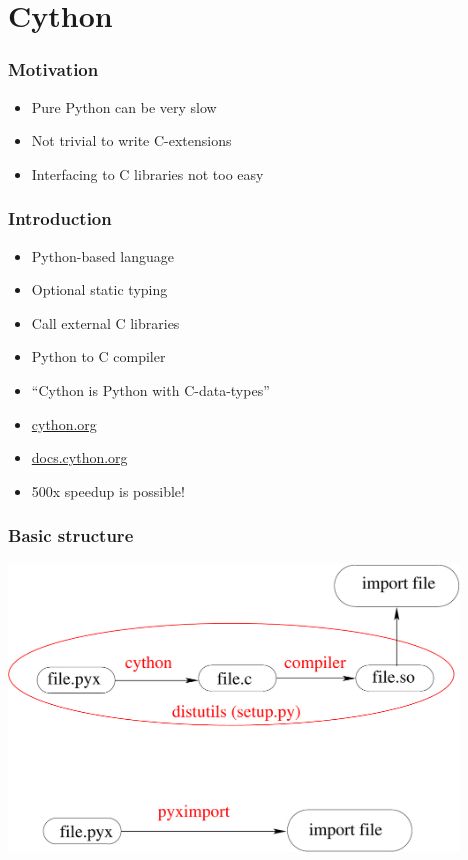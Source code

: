 \documentclass[14pt,compress]{beamer}
\begin{document}
\section{Cython}

\begin{frame}
  \frametitle{Motivation}
  \begin{itemize}

      \item Pure Python can be very slow

      \item Not trivial to write C-extensions

      \item Interfacing to C libraries not too easy 

  \end{itemize}

\end{frame}

\begin{frame}
  \frametitle{Introduction}
  \begin{itemize}
    
    \item Python-based language

    \item Optional static typing

    \item Call external C libraries

    \item Python to C compiler

    \item \alert{``Cython is Python with C-data-types''}

    \item \url{cython.org}

    \item \url{docs.cython.org}
    
    \item 500x speedup is possible!

  \end{itemize}

\end{frame}

\begin{frame}
    \frametitle{Basic structure}

    \includegraphics[height=3in]{data/cython}

\end{frame}
\end{document}
